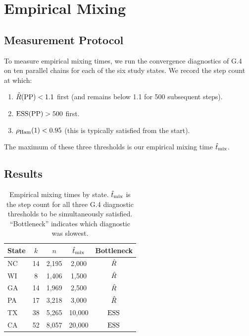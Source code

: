 \section{Empirical Mixing}
\label{sec:empirical}

\subsection{Measurement Protocol}

To measure empirical mixing times, we run the convergence diagnostics
of G.4~\citep{b16paper} on ten parallel \recom{} chains for each
of the six study states.
We record the step count at which:
\begin{enumerate}
\item $\hat{R}(\mathrm{PP}) < 1.1$ first (and remains below 1.1 for 500 subsequent steps).
\item $\mathrm{ESS}(\mathrm{PP}) > 500$ first.
\item $\rho_{\mathrm{Ham}}(1) < 0.95$ (this is typically satisfied from the start).
\end{enumerate}

The maximum of these three thresholds is our empirical mixing time
$\hat{t}_{\rm mix}$.

\subsection{Results}

\begin{table}[h]
\centering
\caption{Empirical mixing times by state. $\hat{t}_{\rm mix}$ is the
         step count for all three G.4 diagnostic thresholds to be
         simultaneously satisfied. ``Bottleneck'' indicates which
         diagnostic was slowest.}
\label{tab:empirical-mixing}
\begin{tabular}{lcccc}
\toprule
State & $k$ & $n$ & $\hat{t}_{\rm mix}$ & Bottleneck \\
\midrule
NC & 14 &  2{,}195 &  2{,}000 & $\hat{R}$ \\
WI &  8 &  1{,}406 &  1{,}500 & $\hat{R}$ \\
GA & 14 &  1{,}969 &  2{,}500 & $\hat{R}$ \\
PA & 17 &  3{,}218 &  3{,}000 & $\hat{R}$ \\
TX & 38 &  5{,}265 & 10{,}000 & $\mathrm{ESS}$ \\
CA & 52 &  8{,}057 & 20{,}000 & $\mathrm{ESS}$ \\
\bottomrule
\end{tabular}
\end{table}


